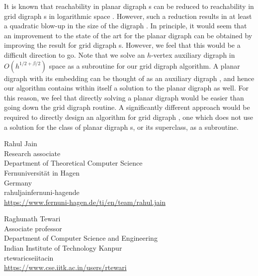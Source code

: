 \documentclass{toc}
\begin{document}
It is known that reachability in planar %
digraph %
s %
can  %
be reduced to reachability in grid %
digraph %
s in logarithmic space \cite{Allender}. However, such a reduction results in at least a quadratic blow-up in the size of the %
digraph %
. In principle, it would seem that an improvement to the 
%
state of the art  %
for the planar %
digraph %
 can be obtained by improving the result for grid %
digraph %
s. However, we feel that this would be a difficult direction to go. Note that we solve an $h$-vertex auxiliary %
digraph %
 in $O(h^{1/2 + \beta/2})$ space as a subroutine for our grid%
digraph %
 algorithm. A planar %
digraph %
 with its embedding can be thought of as an auxiliary %
digraph %
, and hence our algorithm contains within itself a solution to the planar %
digraph %
 as well. For this reason, we feel that directly solving a planar %
digraph %
would be easier than going down the %
%
grid digraph %
 routine. A significantly different approach would be required to directly design an algorithm for %
grid digraph %
, one which does not use a solution for the class of planar %
digraph %
s, or its superclass, as a subroutine.

















%
%
%
%


%
%
%
%
%
\begin{tocauthors}
\begin{tocinfo}[Jain]
Rahul Jain \\
Research associate\\
Department of Theoretical Computer Science\\
Fernuniversit\"at in Hagen\\
Germany\\
rahul\tocdot{}jain\tocat{}fernuni-hagen\tocdot{}de\\   %
\url{https://www.fernuni-hagen.de/ti/en/team/rahul.jain}   %
\end{tocinfo}
\begin{tocinfo}[Tewari]
  Raghunath Tewari\\
 Associate professor\\
 Department of Computer Science and Engineering \\
 Indian Institute of Technology Kanpur\\
  rtewari\tocat{}cse\tocdot{}iit\tocdot{}ac\tocdot{}in \\
  \url{https://www.cse.iitk.ac.in/users/rtewari}
\end{tocinfo}
\end{tocauthors}
\end{document}
